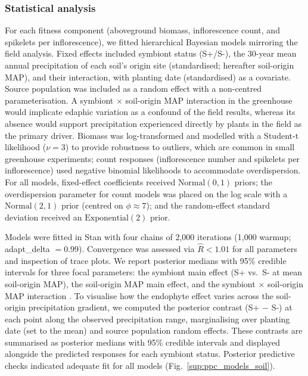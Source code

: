 \documentclass[12pt]{article}\usepackage[]{graphicx}\usepackage[dvipsnames]{xcolor}
\begin{document}
{\subsubsection*{Statistical analysis}
\label{sec:greenhouse_models}
For each fitness component (aboveground biomass, inflorescence count, and spikelets per inflorescence), we fitted hierarchical Bayesian models mirroring the field analysis. Fixed effects included symbiont status 
(S+/S-), the 30-year mean annual precipitation of each soil's origin site (standardised; hereafter soil-origin MAP), and their interaction, with planting date (standardised) as a covariate. 
Source population was included as a random effect with a non-centred parameterisation. 
A symbiont $\times$ soil-origin MAP interaction in the greenhouse would implicate edaphic variation as a confound of the field results, whereas its absence would support precipitation experienced directly 
by plants in the field as the primary driver.
Biomass was log-transformed and modelled with a Student-t likelihood ($\nu = 3$) to provide robustness to outliers, which are common in small greenhouse experiments; count responses (inflorescence number and spikelets 
per inflorescence) used negative binomial likelihoods to accommodate overdispersion. 
For all models, fixed-effect coefficients received $\text{Normal}(0, 1)$ priors; the overdispersion parameter for count models was placed on the log scale with a $\text{Normal}(2, 1)$ prior (centred on 
$\phi \approx 7$); and the random-effect standard deviation received an $\text{Exponential}(2)$ prior.

Models were fitted in Stan \citep{Rstan} with four chains of 2,000 iterations (1,000 warmup; adapt\_delta $= 0.99$). Convergence was assessed via $\hat{R} < 1.01$ for all parameters and inspection of trace plots.
We report posterior medians with 95\% credible intervals for three focal parameters: the symbiont main effect (S+ vs.\ S- at mean soil-origin MAP), the soil-origin MAP main effect, and the symbiont $\times$ soil-origin MAP interaction . 
To visualise how the endophyte effect varies across the soil-origin precipitation gradient, we computed the posterior contrast (S+ $-$ S-) 
at each point along the observed precipitation range, marginalising over planting date (set to the mean) and source population random effects. 
These contrasts are summarised as posterior medians with 95\% credible intervals and displayed alongside the predicted responses for each symbiont 
status. 
Posterior predictive checks indicated adequate fit for all models (Fig.~\ref{sup:ppc_models_soil}).
\clearpage

}
\end{document}
